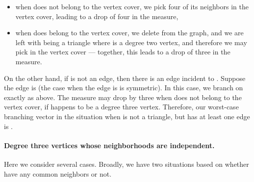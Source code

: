 \documentclass[svgnames]{llncs}
\newcommand{\branchvector}[1]{{\color{IndianRed}{}}}
\begin{document}
\begin{itemize}
\item when  does not belong to the vertex cover, we pick four of its neighbors in the vertex cover, leading to a drop of four in the measure,
\item when  does belong to the vertex cover, we delete  from the graph, and we are left with  being a triangle where  is a degree two vertex, and 
therefore we may pick  in the vertex cover --- together, this leads to a drop of three in the measure. 
\end{itemize}



On the other hand, if  is not an edge, then there is an edge incident to . Suppose the edge is  (the case when the edge is  is symmetric). In this case, we branch on  
exactly as above. The measure may drop by three when  does not belong to the vertex cover, if  happens to be a degree three vertex. Therefore, our worst-case 
branching vector in the situation when  is not a triangle, but has at least one edge is \branchvector{3,3}.

\paragraph{Degree three vertices whose neighborhoods are independent.} 

Here we consider several cases. Broadly, we have two situations based on whether  have any common neighbors or not. 
\end{document}
